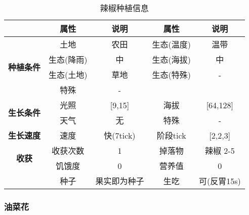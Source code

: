 \begin{table}[H]
    \centering
    \caption{辣椒种植信息}
    \label{table:辣椒种植信息}
    \setlength{\tabcolsep}{4mm}
    \begin{tabular}{c|cc|cc}
        \toprule
                                           & \textbf{属性} & \textbf{说明} & \textbf{属性} & \textbf{说明} \\
        \midrule
        \multirow{4}{*}{\textbf{种植条件}} & 土地          & 农田          & 生态(温度)    & 温带          \\
                                           & 生态(降雨)    & 中            & 生态(海拔)    & 中            \\
                                           & 生态(土地)    & 草地          & 生态(特殊)    & -             \\
                                           & 特殊          & -                                             \\
        \midrule
        \multirow{2}{*}{\textbf{生长条件}} & 光照          & [9,15]        & 海拔          & [64,128]      \\
                                           & 天气          & 无            & 特殊          & -             \\
        \midrule
        \textbf{生长速度}                  & 速度          & 快(7tick)     & 阶段tick      & [2,2,3]       \\
        \midrule
        \multirow{2}{*}{\textbf{收获}}     & 收获次数      & 1             & 掉落物        & 辣椒 2-5      \\
                                           & 饥饿度        & 0             & 营养值        & 0             \\
                                           & 种子          & 果实即为种子  & 生吃          & 可(反胃15s)   \\
        \bottomrule
    \end{tabular}
\end{table}

\subsubsection{油菜花}

